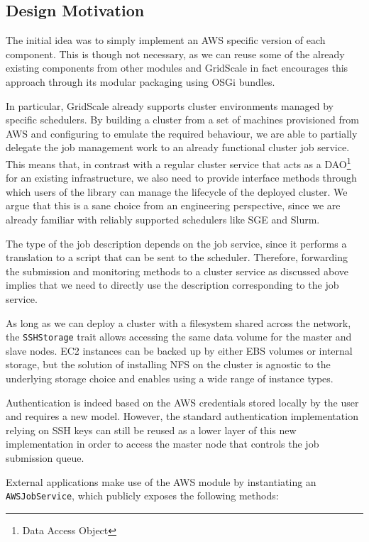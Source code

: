 \subsection{Design Motivation} \label{DesignMotivationSection}

The initial idea was to simply implement an AWS specific version of each component. This is though not necessary, as we can reuse some of the already existing components from other modules and GridScale in fact encourages this approach through its modular packaging using OSGi bundles.

In particular, GridScale already supports cluster environments managed by specific schedulers. By building a cluster from a set of machines provisioned from AWS and configuring to emulate the required behaviour, we are able to partially delegate the job management work to an already functional cluster job service. This means that, in contrast with a regular cluster service that acts as a DAO\footnote{Data Access Object} for an existing infrastructure, we also need to provide interface methods through which users of the library can manage the lifecycle of the deployed cluster. We argue that this is a sane choice from an engineering perspective, since we are already familiar with reliably supported schedulers like SGE and Slurm.

The type of the job description depends on the job service, since it performs a translation to a script that can be sent to the scheduler. Therefore, forwarding the submission and monitoring methods to a cluster service as discussed above implies that we need to directly use the description corresponding to the job service.

As long as we can deploy a cluster with a filesystem shared across the network, the \verb|SSHStorage| trait allows accessing the same data volume for the master and slave nodes. EC2 instances can be backed up by either EBS volumes or internal storage, but the solution of installing NFS on the cluster is agnostic to the underlying storage choice and enables using a wide range of instance types.

Authentication is indeed based on the AWS credentials stored locally by the user and requires a new model. However, the standard authentication implementation relying on SSH keys can still be reused as a lower layer of this new implementation in order to access the master node that controls the job submission queue.

External applications make use of the AWS module by instantiating an \verb|AWSJobService|, which publicly exposes the following methods:


